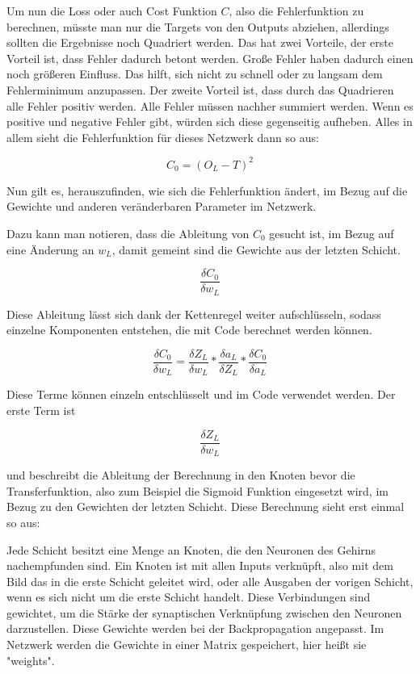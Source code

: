 \documentclass[12pt]{article}
\begin{document}
Um nun die Loss oder auch Cost Funktion $C$, also die Fehlerfunktion zu berechnen, müsste man nur die Targets von den Outputs abziehen, allerdings sollten die Ergebnisse noch Quadriert werden. Das hat zwei Vorteile, der erste Vorteil ist, dass Fehler dadurch betont werden. Große Fehler haben dadurch einen noch größeren Einfluss. Das hilft, sich nicht zu schnell oder zu langsam dem Fehlerminimum anzupassen. Der zweite Vorteil ist, dass durch das Quadrieren alle Fehler positiv werden. Alle Fehler müssen nachher summiert werden. Wenn es positive und negative Fehler gibt, würden sich diese gegenseitig aufheben. 
Alles in allem sieht die Fehlerfunktion für dieses Netzwerk dann so aus:

$$C_0 = (O_L - T)^2$$

Nun gilt es, herauszufinden, wie sich die Fehlerfunktion ändert, im Bezug auf die Gewichte und anderen veränderbaren Parameter im Netzwerk.

Dazu kann man notieren, dass die Ableitung von $C_0$ gesucht ist, im Bezug auf eine Änderung an $w_L$, damit gemeint sind die Gewichte aus der letzten Schicht.

$$\frac{\delta C_0}{\delta w_L}$$

Diese Ableitung lässt sich dank der Kettenregel weiter aufschlüsseln, sodass einzelne Komponenten entstehen, die mit Code berechnet werden können.

$$\frac{\delta C_0}{\delta w_L}=
\frac{\delta Z_L}{\delta w_L}*
\frac{\delta a_L}{\delta Z_L}*
\frac{\delta C_0}{\delta a_L}$$

Diese Terme können einzeln entschlüsselt und im Code verwendet werden. Der erste Term ist

$$\frac{\delta Z_L}{\delta w_L}$$

und beschreibt die Ableitung der Berechnung in den Knoten bevor die Transferfunktion, also zum Beispiel die Sigmoid Funktion eingesetzt wird, im Bezug zu den Gewichten der letzten Schicht.
Diese Berechnung sieht erst einmal so aus:

Jede Schicht besitzt eine Menge an Knoten, die den Neuronen des Gehirns nachempfunden sind. Ein Knoten ist mit allen Inputs verknüpft, also mit dem Bild das in die erste Schicht geleitet wird, oder alle Ausgaben der vorigen Schicht, wenn es sich nicht um die erste Schicht handelt. Diese Verbindungen sind gewichtet, um die Stärke der synaptischen Verknüpfung zwischen den Neuronen darzustellen. Diese Gewichte werden bei der Backpropagation angepasst. Im Netzwerk werden die Gewichte in einer Matrix gespeichert, hier heißt sie "weights". 
\end{document}
